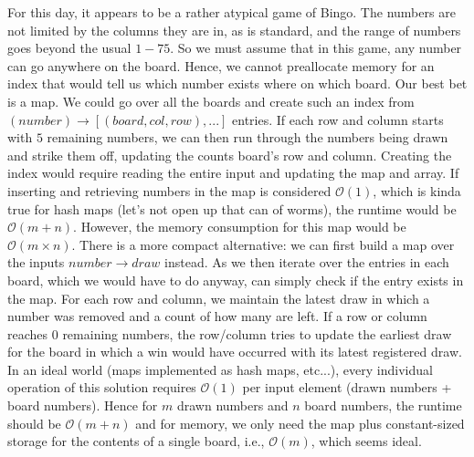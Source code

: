 For this day, it appears to be a rather atypical game of Bingo. The numbers are not limited by the columns they are in, as is standard, and the range of numbers goes beyond the usual $1-75$. So we must assume that in this game, any number can go anywhere on the board. Hence, we cannot preallocate memory for an index that would tell us which number exists where on which board. Our best bet is a map. We could go over all the boards and create such an index from $(number) \rightarrow [(board, col, row), ...]$ entries. If each row and column starts with $5$ remaining numbers, we can then run through the numbers being drawn and strike them off, updating the counts board's row and column. Creating the index would require reading the entire input and updating the map and array. If inserting and retrieving numbers in the map is considered $\mathcal{O}(1)$, which is kinda true for hash maps (let's not open up that can of worms), the runtime would be $\mathcal{O}(m + n)$. However, the memory consumption for this map would be $\mathcal{O}(m \times n)$. There is a more compact alternative: we can first build a map over the inputs $number \rightarrow draw$ instead. As we then iterate over the entries in each board, which we would have to do anyway, can simply check if the entry exists in the map. For each row and column, we maintain the latest draw in which a number was removed and a count of how many are left. If a row or column reaches $0$ remaining numbers, the row/column tries to update the earliest draw for the board in which a win would have occurred with its latest registered draw. In an ideal world (maps implemented as hash maps, etc...), every individual operation of this solution requires $\mathcal{O}(1)$ per input element (drawn numbers + board numbers). Hence for $m$ drawn numbers and $n$ board numbers, the runtime should be $\mathcal{O}(m + n)$ and for memory, we only need the map plus constant-sized storage for the contents of a single board, i.e., $\mathcal{O}(m)$, which seems ideal. 